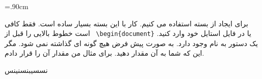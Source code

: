 \documentclass{article}
\begin{document}
\baselineskip=.90cm

برای ایجاد {} از بسته {} استفاده می کنیم. کار با این بسته بسیار ساده است. فقط کافی است خطوط بالایی را قبل از
\verb+ \begin{document}+
یا در فایل استایل خود وارد کنید.  یک دستور به نام {} وجود دارد. به صورت پیش فرض هیچ گونه {}ای گذاشته نمی شود. مگر این که شما به آن مقدار دهید. برای مثال من مقدار آن را {} قرار دادم. 

\ptext[1-10]

نسسیبنسنینس
\end{document}
